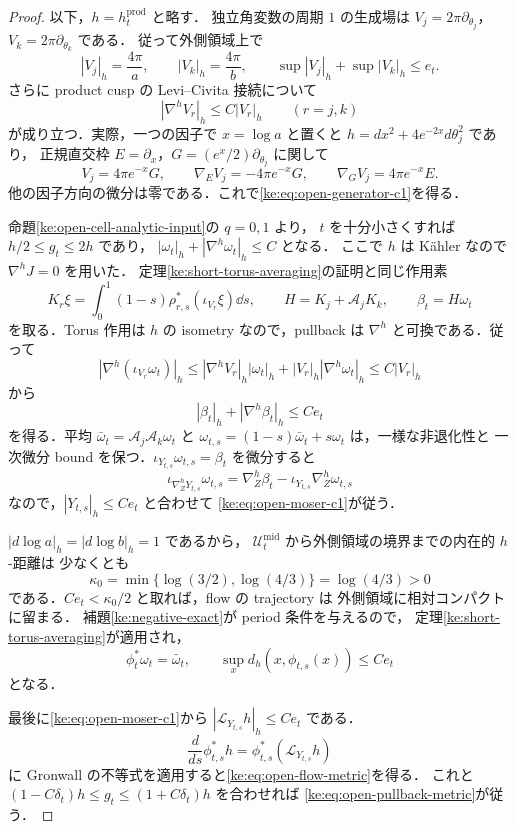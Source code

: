 \begin{proof}
以下，$h=h_t^{\mathrm{prod}}$ と略す．
独立角変数の周期 $1$ の生成場は $V_j=2\pi\partial_{\theta_j}$，
$V_k=2\pi\partial_{\theta_k}$ である．
従って外側領域上で
\[
 |V_j|_h=\frac{4\pi}{a},\qquad
 |V_k|_h=\frac{4\pi}{b},\qquad
 \sup|V_j|_h+\sup|V_k|_h\le e_t.
\]
さらに product cusp の Levi--Civita 接続について
\begin{equation}\label{ke:eq:open-generator-c1}
 |\nabla^hV_r|_h\le C|V_r|_h\qquad(r=j,k)
\end{equation}
が成り立つ．実際，一つの因子で $x=\log a$ と置くと
$h=dx^2+4e^{-2x}d\theta_j^2$ であり，
正規直交枠 $E=\partial_x$，$G=(e^x/2)\partial_{\theta_j}$ に関して
\[
 V_j=4\pi e^{-x}G,\qquad
 \nabla_EV_j=-4\pi e^{-x}G,\qquad
 \nabla_GV_j=4\pi e^{-x}E.
\]
他の因子方向の微分は零である．これで\eqref{ke:eq:open-generator-c1}を得る．

命題\ref{ke:open-cell-analytic-input}の $q=0,1$ より，
$t$ を十分小さくすれば $h/2\le g_t\le2h$ であり，
$|\omega_t|_h+|\nabla^h\omega_t|_h\le C$ となる．
ここで $h$ は Kähler なので $\nabla^hJ=0$ を用いた．
定理\ref{ke:short-torus-averaging}の証明と同じ作用素
\[
 K_r\xi=\int_0^1(1-s)\rho_{r,s}^*(\iota_{V_r}\xi)\dd s,
 \qquad H=K_j+\mathcal A_jK_k,
 \qquad\beta_t=H\omega_t
\]
を取る．Torus 作用は $h$ の isometry なので，pullback は
$\nabla^h$ と可換である．従って
\[
 |\nabla^h(\iota_{V_r}\omega_t)|_h
 \le |\nabla^hV_r|_h|\omega_t|_h
      +|V_r|_h|\nabla^h\omega_t|_h
 \le C|V_r|_h
\]
から
\[
 |\beta_t|_h+|\nabla^h\beta_t|_h\le Ce_t
\]
を得る．平均 $\bar\omega_t=\mathcal A_j\mathcal A_k\omega_t$ と
$\omega_{t,s}=(1-s)\bar\omega_t+s\omega_t$ は，一様な非退化性と
一次微分 bound を保つ．$\iota_{Y_{t,s}}\omega_{t,s}=\beta_t$ を微分すると
\[
 \iota_{\nabla^h_ZY_{t,s}}\omega_{t,s}
 =\nabla^h_Z\beta_t-\iota_{Y_{t,s}}\nabla^h_Z\omega_{t,s}
\]
なので，$|Y_{t,s}|_h\le Ce_t$ と合わせて
\eqref{ke:eq:open-moser-c1}が従う．

$|d\log a|_h=|d\log b|_h=1$ であるから，
$\mathcal U_t^{\mathrm{mid}}$ から外側領域の境界までの内在的 $h$-距離は
少なくとも
\[
 \kappa_0=\min\{\log(3/2),\log(4/3)\}=\log(4/3)>0
\]
である．$Ce_t<\kappa_0/2$ と取れば，flow の trajectory は
外側領域に相対コンパクトに留まる．
補題\ref{ke:negative-exact}が period 条件を与えるので，
定理\ref{ke:short-torus-averaging}が適用され，
\[
 \phi_t^*\omega_t=\bar\omega_t,
 \qquad \sup_x d_h(x,\phi_{t,s}(x))\le Ce_t
\]
となる．

最後に\eqref{ke:eq:open-moser-c1}から
$|\mathcal L_{Y_{t,s}}h|_h\le Ce_t$ である．
\[
 \frac{d}{ds}\phi_{t,s}^*h
   =\phi_{t,s}^*(\mathcal L_{Y_{t,s}}h)
\]
に Gronwall の不等式を適用すると\eqref{ke:eq:open-flow-metric}を得る．
これと $(1-C\delta_t)h\le g_t\le(1+C\delta_t)h$ を合わせれば
\eqref{ke:eq:open-pullback-metric}が従う．
\end{proof}

